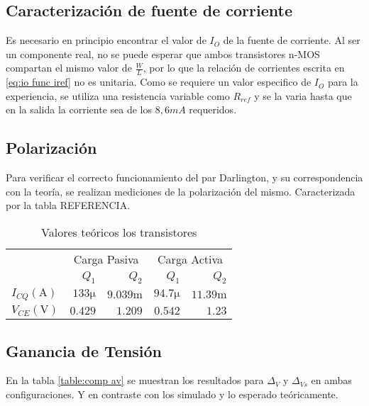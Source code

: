 \subsection{Caracterización de fuente de corriente}

Es necesario en principio encontrar el valor de $I_O$ de la fuente de corriente. Al ser un componente real, no se puede esperar que ambos transistores n-MOS compartan el mismo valor de $\frac{W}{L}$, por lo que la relación de corrientes escrita en \ref{eq:io func iref} no es unitaria.
Como se requiere un valor especifico de $I_O$ para la experiencia, se utiliza una resistencia variable como $R_{ref}$ y se la varia hasta que en la salida la corriente sea de los $8,6 mA$ requeridos.

\subsection{Polarización}

Para verificar el correcto funcionamiento del par Darlington, y su correspondencia con la teoría, se realizan mediciones de la polarización del mismo. Caracterizada por la tabla REFERENCIA.

\begin{table}[ht]
    \centering
    \begin{tabular}{|l|r|r|r|r|}
        \hline
        \multirow{2}{*}{} & \multicolumn{2}{c|}{Carga Pasiva} & \multicolumn{2}{c|}{Carga Activa} \\ \cline{2-5} 
         & $Q_1$ & $Q_2$ & $Q_1$ & $Q_2$ \\ \hline

        $I_{CQ} (\si{\ampere})$ & $133 \si{\micro}$& $9.039\si{\milli}$ & $94.7 \si{\micro}$& $11.39\si{\milli}$\\
        $V_{CE} (\si{\volt})$   & $0.429$            & $1.209$ & $0.542$ & $1.23$ \\ \hline       
    \end{tabular}
    \caption{Valores teóricos los transistores}
    \label{tab:vals_teo}
\end{table}

\subsection{Ganancia de Tensión}

En la tabla \ref{table:comp av} se muestran los resultados para $\Delta_V$ y $\Delta_{Vs}$ en ambas configuraciones. Y en contraste con los simulado y lo esperado teóricamente.



